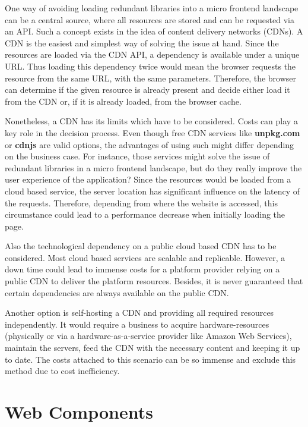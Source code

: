 One way of avoiding loading redundant libraries into a micro frontend landscape can be a central source, where all resources are stored and can be requested via an API. Such a concept exists in the idea of content delivery networks (CDNs).
A CDN is the easiest and simplest way of solving the issue at hand. Since the resources are loaded via the CDN API, a dependency is available under a unique URL. Thus loading this dependency twice would mean the browser requests the resource from the same URL, with the same parameters. Therefore, the browser can determine if the given resource is already present and decide either load it from the CDN or, if it is already loaded, from the browser cache.

Nonetheless, a CDN has its limits which have to be considered. Costs can play a key role in the decision process.
Even though free CDN services like \textbf{unpkg.com} or \textbf{cdnjs} are valid options, the advantages of using such might differ depending on the business case.
For instance, those services might solve the issue of redundant libraries in a micro frontend landscape, but do they really improve the user experience of the application? 
Since the resources would be loaded from a cloud based service, the server location has significant influence on the latency of the requests. Therefore, depending from where the website is accessed, this circumstance could lead to a performance decrease when initially loading the page.

Also the technological dependency on a public cloud based CDN has to be considered. Most cloud based services are scalable and replicable. However, a down time could lead to immense costs for a platform provider relying on a public CDN to deliver the platform resources.
Besides, it is never guaranteed that certain dependencies are always available on the public CDN.

Another option is self-hosting a CDN and providing all required resources independently. It would require a business to acquire hardware-resources (physically or via a hardware-as-a-service provider like Amazon Web Services), maintain the servers, feed the CDN with the necessary content and keeping it up to date. The costs attached to this scenario can be so immense and exclude this method due to cost inefficiency.\cite{Meassuring_a_commercial_CDN}

\section{Web Components}

